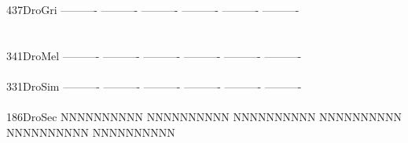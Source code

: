 \documentclass[11pt,twoside,reqno,a4paper]{article}
\begin{document}
{437\hspace*{1\charwidth}DroGri	----------	----------	----------	----------	----------	----------	\\
\hspace*{4\charwidth}\hspace*{7\charwidth}\hspace*{1\charwidth}\hspace*{1\charwidth}\hspace*{1\charwidth}\hspace*{1\charwidth}\hspace*{1\charwidth}\hspace*{1\charwidth}\\
\\
341\hspace*{1\charwidth}DroMel	----------	----------	----------	----------	----------	----------	\\
\hspace*{4\charwidth}\hspace*{7\charwidth}\hspace*{1\charwidth}\hspace*{1\charwidth}\hspace*{1\charwidth}\hspace*{1\charwidth}\hspace*{1\charwidth}\hspace*{1\charwidth}\\
331\hspace*{1\charwidth}DroSim	----------	----------	----------	----------	----------	----------	\\
\hspace*{4\charwidth}\hspace*{7\charwidth}\hspace*{1\charwidth}\hspace*{1\charwidth}\hspace*{1\charwidth}\hspace*{1\charwidth}\hspace*{1\charwidth}\hspace*{1\charwidth}\\
186\hspace*{1\charwidth}DroSec	NNNNNNNNNN	NNNNNNNNNN	NNNNNNNNNN	NNNNNNNNNN	NNNNNNNNNN	NNNNNNNNNN	\\
\hspace*{4\charwidth}\hspace*{7\charwidth}\hspace*{1\charwidth}\hspace*{1\charwidth}\hspace*{1\charwidth}\hspace*{1\charwidth}\hspace*{1\charwidth}\hspace*{1\charwidth}\\
}
\end{document}
